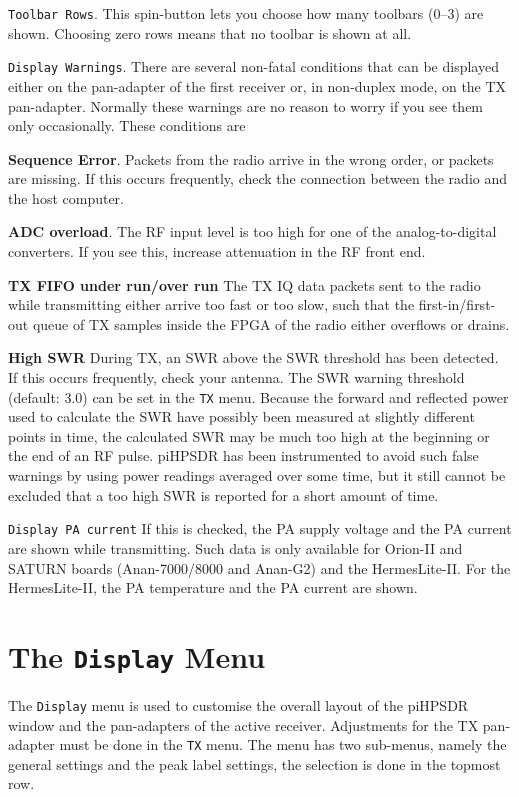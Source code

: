 \documentclass[12pt]{book}
\def\rett#1{\texttt{\color{red}#1}}
\def\bltt#1{\texttt{\color{blue}#1}}
\def\pH{pi\-HPSDR\xspace}
\begin{document}
\rett{Toolbar Rows}. This spin-button lets you choose how many toolbars
(0--3) are shown. Choosing zero rows means that no toolbar is shown at all.

\rett{Display Warnings}. There are several non-fatal conditions that can
be displayed either on the pan-adapter of the first receiver or, in non-duplex
mode, on the TX pan-adapter. Normally these warnings are no reason to worry
if you see them  only occasionally. These conditions are

\textbf{Sequence Error}. Packets from the radio arrive in the wrong order, or packets
are missing. If this occurs frequently, check the connection between the radio and
the host computer.

\textbf{ADC overload}. The RF input level is too high for one of the analog-to-digital
converters. If you see this, increase attenuation in the RF front end.

\textbf{TX FIFO under run/over run} The TX IQ data packets sent to the radio while transmitting
either arrive too fast or too slow, such that the first-in/first-out queue of TX samples
inside the FPGA of the radio either overflows or drains.

\textbf{High SWR} During TX, an SWR above the SWR threshold has been detected. If this occurs
frequently, check your antenna. The SWR warning threshold (default: 3.0) can be set in the
\bltt{TX} menu. Because the forward and reflected power used to calculate the SWR have
possibly been measured at slightly different points in time, the calculated SWR may be
much too high at the beginning or the end of an RF pulse. \pH has been instrumented to
avoid such false warnings by using power readings averaged over some time, but it still
cannot be excluded that a too high SWR is reported for a short amount of time.

\rett{Display PA current} If this is checked, the PA supply voltage and the PA current
are shown while transmitting. Such data is only available for Orion-II and SATURN boards
(Anan-7000/8000 and Anan-G2) and the HermesLite-II.
For the HermesLite-II, the PA temperature and the PA current are shown.
\section{The \texttt{Display} Menu}

The \bltt{Display} menu is used to customise the overall layout of the \pH
window and the pan-adapters of the active receiver. Adjustments
for the TX pan-adapter must be done in the \bltt{TX} menu. The menu has two sub-menus,
namely the general settings and the peak label settings, the selection is done
in the topmost row.
\end{document}
